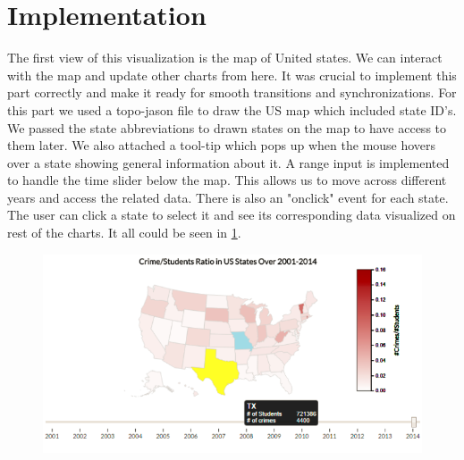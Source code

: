 \documentclass[12pt]{article}
\begin{document}
\section{Implementation}
The first view of this visualization is the map of United states. We can interact with the map and update other charts from here. It was crucial to implement this part correctly and make it ready for smooth transitions and synchronizations.
For this part we used a topo-jason file to draw the US map which included state ID's. We passed the state abbreviations to drawn states on the map to have access to them later. We also attached a tool-tip which pops up when the mouse hovers over a state showing general information about it. A range input is implemented to handle the time slider below the map. This allows us to move across different years and access the related data. There is also an "onclick" event for each state. The user can click a state to select it and see its corresponding data visualized on rest of the charts. It all could be seen in \cref{fig:map}.

\begin{figure}[H]
   \centering{}
	       \includegraphics[width=5in]{map.PNG}           
\caption{}
\label{fig:map}
\end{figure}
\end{document}
